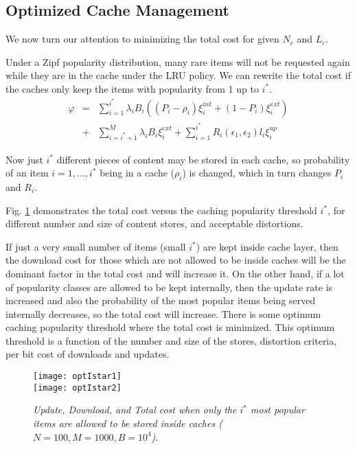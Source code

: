 \documentclass[conference]{IEEEtran}
\theoremstyle{plain}
\theoremstyle{remark}
\begin{document}
\subsection{Optimized Cache Management}
\label{subsec:optimumi}

We now turn our attention to minimizing the total cost for given $N_c$ and $L_c$.


 Under a Zipf popularity distribution, many rare items will not be requested again while they are in the cache under the LRU policy. We can rewrite the total cost if the caches only keep the items with popularity from 1 up to $i^*$. 
\begin{eqnarray}
\varphi &=& \sum_{i=1}^{i^*} \lambda_i  B_i \left((P_i-\rho_i)\xi^{int}_i + (1-P_i)\xi^{ext}_i\right)\nonumber \\ &+& \sum_{i=i^*+1}^M  \lambda_i  B_i \xi^{ext}_i + \sum_{i=1}^{i^*} R_i(\epsilon_1,\epsilon_2) l_i \xi^{up}_i  \label{eq:phiwthr}
\end{eqnarray}



Now just $i^*$ different pieces of content may be stored in each cache, so probability of an item $i=1,...,i^*$ being in a cache ($\rho_i$) is changed, which in turn changes $P_i$ and $R_i$.

Fig. \ref{fig:optIstar} demonstrates the total cost versus the caching popularity threshold $i^*$, for different number and size of content stores, and acceptable distortions.

If just a very small number of items (small $i^*$) are kept inside cache layer, then the download cost for those which are not allowed to be inside caches will be the dominant factor in the total cost and will increase it. On the other hand, if a lot of popularity classes are allowed to be kept internally, then the update rate is increased and also the probability of the most popular items being served internally decreases, so the total cost will increase. There is some optimum caching popularity threshold where the total cost is minimized. This optimum threshold is a function of the number and size of the stores, distortion criteria, per bit cost of downloads and updates.

\begin{figure}[http]
    \center
      \texttt{[image: optIstar1]}\\
      \texttt{[image: optIstar2]}\\
      \caption{\textit{Update, Download, and Total cost when only the $i^*$ most popular items are allowed to be stored inside caches ($N=100,M=1000,B=10^4$).}}
    \label{fig:optIstar}
\end{figure}
\end{document}
